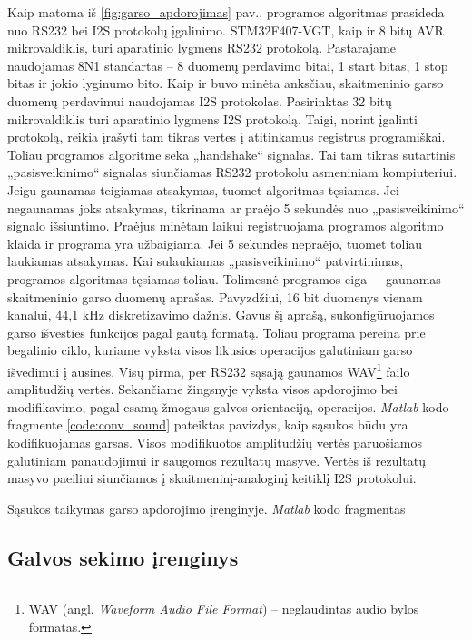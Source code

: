 \documentclass[]{vgtuef}
\begin{document}
{Kaip matoma iš \ref{fig:garso_apdorojimas} pav., programos algoritmas prasideda nuo RS232 bei I2S protokolų įgalinimo. STM32F407-VGT, kaip ir 8 bitų AVR mikrovaldiklis, turi aparatinio lygmens RS232 protokolą. Pastarajame naudojamas 8N1 standartas – 8 duomenų perdavimo bitai, 1 start bitas, 1 stop bitas ir jokio lyginumo bito. Kaip ir buvo minėta anksčiau, skaitmeninio garso duomenų perdavimui naudojamas I2S protokolas. Pasirinktas 32 bitų mikrovaldiklis turi aparatinio lygmens I2S protokolą. Taigi, norint įgalinti protokolą, reikia įrašyti tam tikras vertes į atitinkamus registrus programiškai. Toliau programos algoritme seka „handshake“ signalas. Tai tam tikras sutartinis „pasisveikinimo“ signalas siunčiamas RS232 protokolu asmeniniam kompiuteriui. Jeigu gaunamas teigiamas atsakymas, tuomet algoritmas tęsiamas. Jei negaunamas joks atsakymas, tikrinama ar praėjo 5 sekundės nuo „pasisveikinimo“ signalo išsiuntimo. Praėjus minėtam laikui registruojama programos algoritmo klaida ir programa yra užbaigiama. Jei 5 sekundės nepraėjo, tuomet toliau laukiamas atsakymas. Kai sulaukiamas „pasisveikinimo“ patvirtinimas, programos algoritmas tęsiamas toliau. Tolimesnė programos eiga -– gaunamas skaitmeninio garso duomenų aprašas. Pavyzdžiui, 16 bit duomenys vienam kanalui, 44,1 kHz diskretizavimo dažnis. Gavus šį aprašą, sukonfigūruojamos garso išvesties funkcijos pagal gautą formatą. Toliau programa pereina prie begalinio ciklo, kuriame vyksta visos likusios operacijos galutiniam garso išvedimui į ausines. Visų pirma, per RS232 sąsają gaunamos WAV\footnote{  WAV (angl. \textit{Waveform Audio File Format}) -- neglaudintas audio bylos formatas.} failo amplitudžių vertės. Sekančiame žingsnyje vyksta visos apdorojimo bei modifikavimo, pagal esamą žmogaus galvos orientaciją, operacijos. \textit{Matlab} kodo fragmente \ref{code:conv_sound} pateiktas pavizdys, kaip sąsukos būdu yra kodifikuojamas garsas. Visos modifikuotos amplitudžių vertės paruošiamos galutiniam panaudojimui ir saugomos rezultatų masyve. Vertės iš rezultatų masyvo paeiliui siunčiamos į skaitmeninį-analoginį keitiklį I2S protokolui.

\begin{cfigure}
  \centering
  \caption{Sąsukos taikymas garso apdorojimo įrenginyje. \textit{Matlab} kodo fragmentas}
  \label{code:conv_sound}
  
\end{cfigure}

\newpage

\subsection{Galvos sekimo įrenginys}

}
\end{document}
